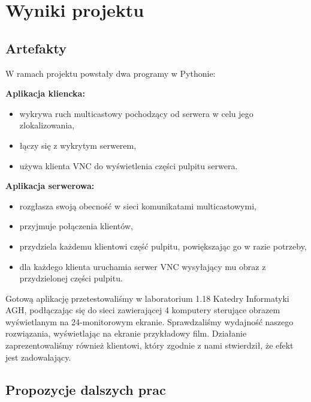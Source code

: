 \section{Wyniki projektu}

  \subsection{Artefakty}

    W ramach projektu powstały dwa programy w Pythonie:

    \vspace{3mm}

    \textbf{Aplikacja kliencka:}
    \begin{itemize}[noitemsep,nolistsep]
      \item wykrywa ruch multicastowy pochodzący od serwera w celu jego zlokalizowania,
      \item łączy się z wykrytym serwerem,
      \item używa klienta VNC do wyświetlenia części pulpitu serwera.
    \end{itemize}

    \vspace{3mm}

    \textbf{Aplikacja serwerowa:}
    \begin{itemize}[noitemsep,nolistsep]
      \item rozgłasza swoją obecność w sieci komunikatami multicastowymi,
      \item przyjmuje połączenia klientów,
      \item przydziela każdemu klientowi część pulpitu, powiększając go w razie potrzeby,
      \item dla każdego klienta uruchamia serwer VNC wysyłający mu obraz z przydzielonej części pulpitu.
    \end{itemize}

    \vspace{3mm}

    Gotową aplikację przetestowaliśmy w laboratorium 1.18 Katedry Informatyki AGH, podłączając się do sieci zawierającej 4 komputery sterujące obrazem wyświetlanym na 24-monitorowym ekranie. Sprawdzaliśmy wydajność naszego rozwiązania, wyświetlając na ekranie przykładowy film. Działanie zaprezentowaliśmy również klientowi, który zgodnie z nami stwierdził, że efekt jest zadowalający.

  \subsection{Propozycje dalszych prac}

